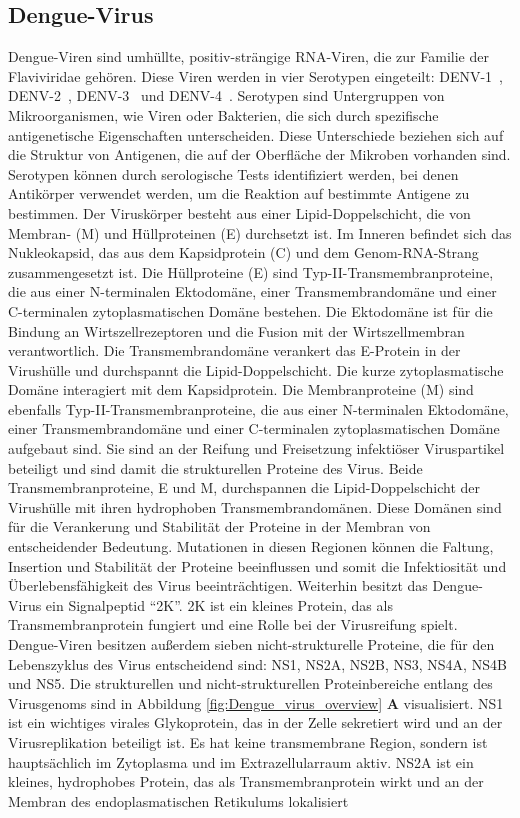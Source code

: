 \documentclass[german,version-2022-01]{uzl-thesis}
\begin{document}
\subsection{Dengue-Virus}
Dengue-Viren sind umh\"ullte, positiv-str\"angige RNA-Viren, die zur Familie der Flaviviridae geh\"oren. Diese Viren werden in vier Serotypen eingeteilt: DENV-1~\cite{tittarelli_dengue_2014}, DENV-2~\cite{cao_retrospective_2023}, DENV-3~\cite{peyrefitte_genetic_2003} und DENV-4~\cite{wardhani_genetic_2023}. Serotypen sind Untergruppen von Mikroorganismen, wie Viren oder Bakterien, die sich durch spezifische antigenetische Eigenschaften unterscheiden. Diese Unterschiede beziehen sich auf die Struktur von Antigenen, die auf der Oberfl\"ache der Mikroben vorhanden sind. Serotypen k\"onnen durch serologische Tests identifiziert werden, bei denen Antik\"orper verwendet werden, um die Reaktion auf bestimmte Antigene zu bestimmen. Der Virusk\"orper besteht aus einer Lipid-Doppelschicht, die von Membran- (M) und H\"ullproteinen (E) durchsetzt ist. Im Inneren befindet sich das Nukleokapsid, das aus dem Kapsidprotein (C) und dem Genom-RNA-Strang zusammengesetzt ist. Die H\"ullproteine (E) sind Typ-II-Transmembranproteine, die aus einer N-terminalen Ektodom\"ane, einer Transmembrandom\"ane und einer C-terminalen zytoplasmatischen Dom\"ane bestehen. Die Ektodom\"ane ist f\"ur die Bindung an Wirtszellrezeptoren und die Fusion mit der Wirtszellmembran verantwortlich. Die Transmembrandom\"ane verankert das E-Protein in der Virush\"ulle und durchspannt die Lipid-Doppelschicht. Die kurze zytoplasmatische Dom\"ane interagiert mit dem Kapsidprotein. Die Membranproteine (M) sind ebenfalls Typ-II-Transmembranproteine, die aus einer N-terminalen Ektodom\"ane, einer Transmembrandom\"ane und einer C-terminalen zytoplasmatischen Dom\"ane aufgebaut sind. Sie sind an der Reifung und Freisetzung infekti\"oser Viruspartikel beteiligt und sind damit die strukturellen Proteine des Virus. Beide Transmembranproteine, E und M, durchspannen die Lipid-Doppelschicht der Virush\"ulle mit ihren hydrophoben Transmembrandom\"anen. Diese Dom\"anen sind f\"ur die Verankerung und Stabilit\"at der Proteine in der Membran von entscheidender Bedeutung. Mutationen in diesen Regionen k\"onnen die Faltung, Insertion und Stabilit\"at der Proteine beeinflussen und somit die Infektiosit\"at und \"Uberlebensf\"ahigkeit des Virus beeintr\"achtigen. Weiterhin besitzt das Dengue-Virus ein Signalpeptid "`2K"'. 2K ist ein kleines Protein, das als Transmembranprotein fungiert und eine Rolle bei der Virusreifung spielt. Dengue-Viren besitzen au\ss{}erdem sieben nicht-strukturelle Proteine, die f\"ur den Lebenszyklus des Virus entscheidend sind: NS1, NS2A, NS2B, NS3, NS4A, NS4B und NS5. Die strukturellen und nicht-strukturellen Proteinbereiche entlang des Virusgenoms sind in Abbildung \ref{fig:Dengue_virus_overview} \textbf{A} visualisiert. NS1 ist ein wichtiges virales Glykoprotein, das in der Zelle sekretiert wird und an der Virusreplikation beteiligt ist. Es hat keine transmembrane Region, sondern ist haupts\"achlich im Zytoplasma und im Extrazellularraum aktiv. NS2A ist ein kleines, hydrophobes Protein, das als Transmembranprotein wirkt und an der Membran des endoplasmatischen Retikulums lokalisiert 
\end{document}
